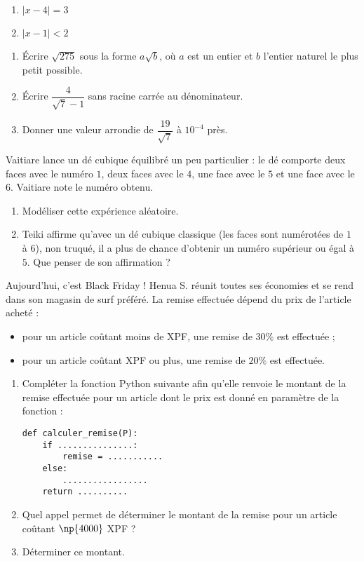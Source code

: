 \documentclass[a4paper,dvipsnames]{article}
\begin{document}
\begin{multicols}{2}
  \begin{enumerate}
    \item $|x-4|=3$
    \item $|x-1|<2$
  \end{enumerate}
\end{multicols}

\bigskip

\exo[3 points] \vspace{-2mm} 
\begin{enumerate}
  \item Écrire $\sqrt{275}$ sous la forme $a\sqrt{b}$, où $a$ est un entier et $b$ l'entier naturel le plus petit possible.
  \item Écrire $\dfrac{4}{\sqrt{7}-1}$ sans racine carrée au dénominateur.
  \item Donner une valeur arrondie de $\dfrac{19}{\sqrt{7}}$ à $10^{-4}$ près.
\end{enumerate}

\bigskip

\exo[3 points] Vaitiare lance un dé cubique équilibré un peu particulier : le dé comporte deux faces avec le numéro $1$, deux faces avec le $4$, une face avec le $5$ et une face avec le $6$. Vaitiare note le numéro obtenu.
\begin{enumerate}
  \item Modéliser cette expérience aléatoire.
  \item Teiki affirme qu'avec un dé cubique \og{}classique\fg{} (les faces sont numérotées de $1$ à $6$), non truqué, il a plus de chance d'obtenir un numéro supérieur ou égal à $5$. Que penser de son affirmation ?
\end{enumerate}

\pagebreak

\exo[4 points] Aujourd'hui, c'est Black Friday ! Henua S. réunit toutes ses économies et se rend dans son magasin de surf préféré. La remise effectuée dépend du prix de l'article acheté :
\begin{itemize}
  \item pour un article coûtant moins de  XPF, une remise de $30\%$ est effectuée ;
  \item pour un article coûtant  XPF ou plus, une remise de $20\%$ est effectuée.
\end{itemize}
\begin{enumerate}
  \item Compléter la fonction Python suivante afin qu'elle renvoie le montant de la remise effectuée pour un article dont le prix est donné en paramètre de la fonction :
    \begin{verbatim}
def calculer_remise(P):
    if ...............:
        remise = ...........
    else:
        .................
    return ..........
    \end{verbatim}
  \item Quel appel permet de déterminer le montant de la remise pour un article coûtant $\np{4000}$ XPF ?
  \item Déterminer ce montant.
\end{enumerate}
\end{document}
